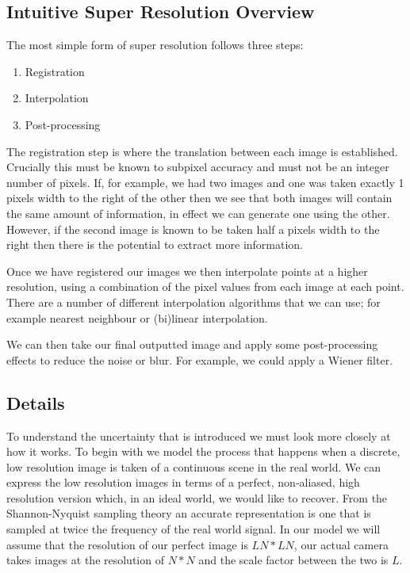 \subsection*{Intuitive Super Resolution Overview}
The most simple form of super resolution follows three steps:

\begin{enumerate}
	\item Registration
	\item Interpolation
	\item Post-processing
\end{enumerate}

The registration step is where the translation between each image is established. Crucially this must be known to subpixel accuracy and must not be an integer number of pixels. If, for example, we had two images and one was taken exactly 1 pixels width to the right of the other then we see that both images will contain the same amount of information, in effect we can generate one using the other. However, if the second image is known to be taken half a pixels width to the right then there is the potential to extract more information.

Once we have registered our images we then interpolate points at a higher resolution, using a combination of the pixel values from each image at each point. There are a number of different interpolation algorithms that we can use; for example nearest neighbour or (bi)linear interpolation.

We can then take our final outputted image and apply some post-processing effects to reduce the noise or blur. For example, we could apply a Wiener filter\cite{wienerfilter}.

\subsection*{Details}
To understand the uncertainty that is introduced we must look more closely at how it works.
To begin with we model the process that happens when a discrete, low resolution image is taken of a continuous scene in the real world. We can express the low resolution images in terms of a perfect, non-aliased, high resolution version which, in an ideal world, we would like to recover. From the Shannon-Nyquist sampling theory an accurate representation is one that is sampled at twice the frequency of the real world signal\cite{shannonnyquist}. In our model we will assume that the resolution of our perfect image is $LN * LN$, our actual camera takes images at the resolution of $N * N$ and the scale factor between the two is $L$.

